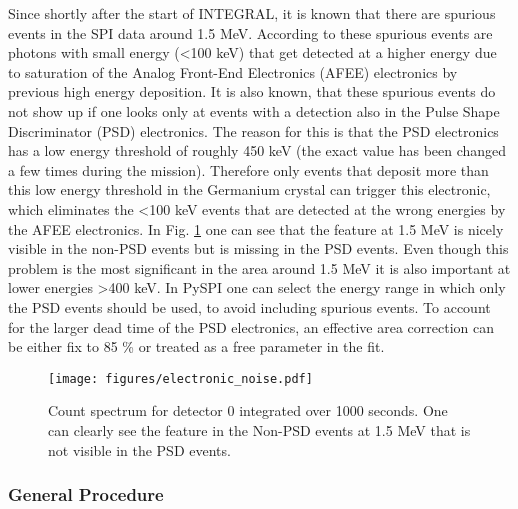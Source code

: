 \documentclass[twocolumn]{aa}
\begin{document}
Since shortly after the start of INTEGRAL, it is known that there are spurious events in the SPI data around 1.5 MeV. According to \citet{spi_electronic_noise} these spurious events are photons with small energy (<100 keV) that get detected at a higher energy due to saturation of the Analog Front-End Electronics (AFEE) electronics by previous high energy deposition. It is also known, that these spurious events do not show up if one looks only at events with a detection also in the Pulse Shape Discriminator (PSD) electronics. The reason for this is that the PSD electronics has a low energy threshold of roughly 450 keV (the exact value has been changed a few times during the mission). Therefore only events that deposit more than this low energy threshold in the Germanium crystal can trigger this electronic, which eliminates the <100 keV events that are detected at the wrong energies by the AFEE electronics. In Fig. \ref{fig:electronic} one can see that the feature at 1.5 MeV is nicely visible in the non-PSD events but is missing in the PSD events. Even though this problem is the most significant in the area around 1.5 MeV it is also important at lower energies >400 keV. In PySPI one can select the energy range in which only the PSD events should be used, to avoid including spurious events. To account for the larger dead time of the PSD electronics, an effective area correction can be either fix to 85 \% \citep{spi_electronic_noise} or treated as a free parameter in the fit.

\begin{figure}
    \begin{centering}
        \texttt{[image: figures/electronic\_noise.pdf]}
        \caption{Count spectrum for detector 0 integrated over 1000 seconds. One can clearly see the feature in the Non-PSD events at 1.5 MeV that is not visible in the PSD events.}
        \label{fig:electronic}
    \end{centering}
\end{figure}

\subsubsection*{General Procedure}
\end{document}
